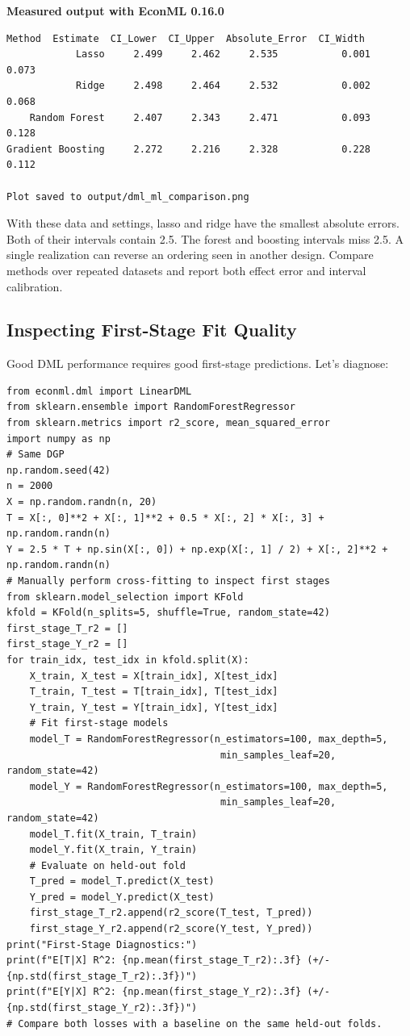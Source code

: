 \textbf{Measured output with EconML 0.16.0}

\begin{verbatim}
Method  Estimate  CI_Lower  CI_Upper  Absolute_Error  CI_Width
            Lasso     2.499     2.462     2.535           0.001     0.073
            Ridge     2.498     2.464     2.532           0.002     0.068
    Random Forest     2.407     2.343     2.471           0.093     0.128
Gradient Boosting     2.272     2.216     2.328           0.228     0.112

Plot saved to output/dml_ml_comparison.png
\end{verbatim}

With these data and settings, lasso and ridge have the smallest absolute
errors. Both of their intervals contain 2.5. The forest and boosting
intervals miss 2.5. A single realization can reverse an ordering seen in
another design. Compare methods over repeated datasets and report both
effect error and interval calibration.

\subsection{Inspecting First-Stage Fit
Quality}\label{_inspecting_first_stage_fit_quality}

Good DML performance requires good first-stage predictions. Let's
diagnose:

\begin{verbatim}
from econml.dml import LinearDML
from sklearn.ensemble import RandomForestRegressor
from sklearn.metrics import r2_score, mean_squared_error
import numpy as np
# Same DGP
np.random.seed(42)
n = 2000
X = np.random.randn(n, 20)
T = X[:, 0]**2 + X[:, 1]**2 + 0.5 * X[:, 2] * X[:, 3] + np.random.randn(n)
Y = 2.5 * T + np.sin(X[:, 0]) + np.exp(X[:, 1] / 2) + X[:, 2]**2 + np.random.randn(n)
# Manually perform cross-fitting to inspect first stages
from sklearn.model_selection import KFold
kfold = KFold(n_splits=5, shuffle=True, random_state=42)
first_stage_T_r2 = []
first_stage_Y_r2 = []
for train_idx, test_idx in kfold.split(X):
    X_train, X_test = X[train_idx], X[test_idx]
    T_train, T_test = T[train_idx], T[test_idx]
    Y_train, Y_test = Y[train_idx], Y[test_idx]
    # Fit first-stage models
    model_T = RandomForestRegressor(n_estimators=100, max_depth=5,
                                     min_samples_leaf=20, random_state=42)
    model_Y = RandomForestRegressor(n_estimators=100, max_depth=5,
                                     min_samples_leaf=20, random_state=42)
    model_T.fit(X_train, T_train)
    model_Y.fit(X_train, Y_train)
    # Evaluate on held-out fold
    T_pred = model_T.predict(X_test)
    Y_pred = model_Y.predict(X_test)
    first_stage_T_r2.append(r2_score(T_test, T_pred))
    first_stage_Y_r2.append(r2_score(Y_test, Y_pred))
print("First-Stage Diagnostics:")
print(f"E[T|X] R^2: {np.mean(first_stage_T_r2):.3f} (+/-{np.std(first_stage_T_r2):.3f})")
print(f"E[Y|X] R^2: {np.mean(first_stage_Y_r2):.3f} (+/-{np.std(first_stage_Y_r2):.3f})")
# Compare both losses with a baseline on the same held-out folds.
\end{verbatim}

